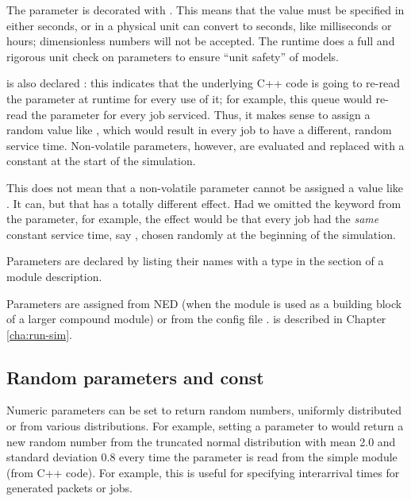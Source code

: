 The  parameter is decorated with . This means
that the value must be specified in either seconds, or in a physical unit \opp
can convert to seconds, like milliseconds or hours; dimensionless numbers
will not be accepted. The \opp runtime does a full and rigorous unit check on
parameters to ensure ``unit safety'' of models.

 is also declared : this indicates that the
underlying C++ code is going to re-read the parameter at runtime for every
use of it; for example, this queue would re-read the parameter for every job
serviced. Thus, it makes sense to assign  a random value like
, which would result in every job to have a different,
random service time. Non-volatile parameters, however, are evaluated and
replaced with a constant at the start of the simulation.

\begin{note}
    This does not mean that a non-volatile parameter cannot be assigned a value
    like . It can, but that has a totally different
    effect. Had we omitted the  keyword from the
     parameter, for example, the effect would be that every
    job had the \textit{same} constant service time, say ,
    chosen randomly at the beginning of the simulation.
\end{note}

Parameters are declared by listing their names with a type in the
 section of a module description.

Parameters are assigned from NED (when the module is used as a building block
of a larger compound module) or from the config file .
 is described in Chapter \ref{cha:run-sim}.


\subsection{Random parameters and const}
\label{sec:ch-ned-lang:const}

Numeric parameters can be set to return random numbers, uniformly
distributed or from various distributions. For example, setting a
parameter to  would return a new random number
from the truncated normal distribution with mean 2.0 and standard deviation 0.8
every time the parameter is read from the simple module (from C++ code).
For example, this is useful for specifying interarrival times for generated
packets or jobs.

